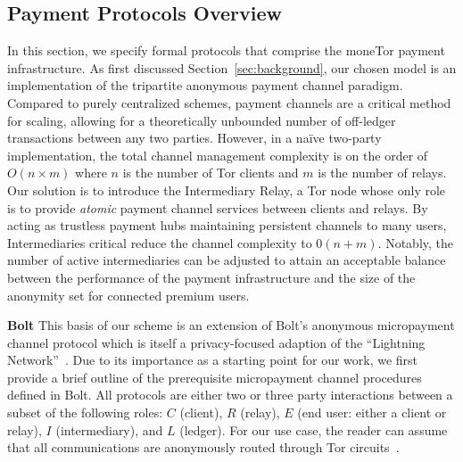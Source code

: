\subsection{Payment Protocols Overview}
\label{sec:payment_overview}

In this section, we specify formal protocols that comprise the moneTor payment infrastructure.
As first discussed Section~\ref{sec:background}, our chosen model is an implementation of the tripartite anonymous payment channel paradigm.
Compared to purely centralized schemes, payment channels are a critical method for scaling, allowing for a theoretically unbounded number of off-ledger transactions between any two parties.
However, in a na\"{i}ve two-party implementation, the total channel management complexity is on the order of $O(n \times m)$ where $n$ is the number of Tor clients and $m$ is the number of relays.
Our solution is to introduce the Intermediary Relay, a Tor node whose only role is to provide \emph{atomic} payment channel services between clients and relays.
By acting as trustless payment hubs maintaining persistent channels to many users, Intermediaries critical reduce the channel complexity to $0(n+m)$.
Notably, the number of active intermediaries can be adjusted to attain an acceptable balance between the performance of the payment infrastructure and the size of the anonymity set for connected premium users.

\medskip \noindent\textbf{Bolt} This basis of our scheme is an extension of Bolt's anonymous micropayment channel protocol which is itself a privacy-focused adaption of the ``Lightning Network''~\cite{poon2016bitcoin}.
Due to its importance as a starting point for our work, we first provide a brief outline of the prerequisite micropayment channel procedures defined in Bolt.
All protocols are either two or three party interactions between a subset of the following roles: $C$ (client), $R$ (relay), $E$ (end user: either a client or relay), $I$ (intermediary), and $L$ (ledger).
For our use case, the reader can assume that all communications are anonymously routed through Tor circuits~\cite{green2017bolt}.

